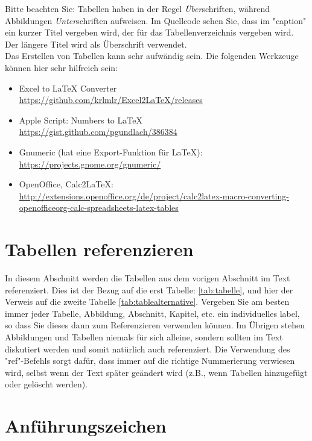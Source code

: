 Bitte beachten Sie: Tabellen haben in der Regel \textit{Über}schriften, während Abbildungen \textit{Unter}schriften aufweisen. Im Quellcode sehen Sie, dass im "caption" ein kurzer Titel vergeben wird, der für das Tabellenverzeichnis vergeben wird. Der längere Titel wird als Überschrift verwendet.  \\

Das Erstellen von Tabellen kann sehr aufwändig sein. Die folgenden Werkzeuge können hier sehr hilfreich sein:

\begin{itemize}
	\item Excel to \LaTeX{} Converter\\ \url{https://github.com/krlmlr/Excel2LaTeX/releases}
	\item Apple Script: Numbers to \LaTeX{} \\ \url{https://gist.github.com/pgundlach/386384}
	\item Gnumeric (hat eine Export-Funktion für \LaTeX{}): \\ \url{https://projects.gnome.org/gnumeric/}
	\item OpenOffice, Calc2LaTeX: \url{http://extensions.openoffice.org/de/project/calc2latex-macro-converting-openofficeorg-calc-spreadsheets-latex-tables}
\end{itemize}

\section{Tabellen referenzieren}
\label{sec:tabellen_ref}
In diesem Abschnitt werden die Tabellen aus dem vorigen Abschnitt im Text referenziert. Dies ist der Bezug auf die erst Tabelle: \ref{tab:tabelle}, und hier der Verweis auf die zweite Tabelle \ref{tab:tablealternative}. Vergeben Sie am besten immer jeder Tabelle, Abbildung, Abschnitt, Kapitel, etc. ein individuelles label, so dass Sie dieses dann zum Referenzieren verwenden können. Im Übrigen stehen Abbildungen und Tabellen niemals für sich alleine, sondern sollten im Text diskutiert werden und somit natürlich auch referenziert. Die Verwendung des "ref{}"-Befehls sorgt dafür, dass immer auf die richtige Nummerierung verwiesen wird, selbst wenn der Text später geändert wird (z.B., wenn Tabellen hinzugefügt oder gelöscht werden). 

\section{Anführungszeichen}
\label{sec:Anfuehrungszeichen}

